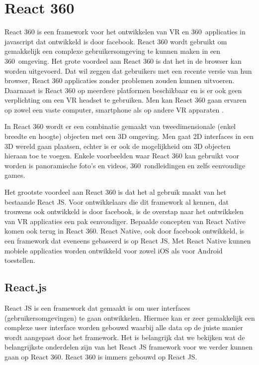 \chapter{React 360}
\label{ch:react-360}

React 360 is een framework voor het ontwikkelen van VR en 360\textdegree\ applicaties in javascript dat ontwikkeld is door facebook. React 360 wordt gebruikt om gemakkelijk een complexe gebruikersomgeving te kunnen maken in een 360\textdegree\ omgeving. Het grote voordeel aan React 360 is dat het in de browser kan worden uitgevoerd. Dat wil zeggen dat gebruikers met een recente versie van hun browser, React 360 applicaties zonder problemen zouden kunnen uitvoeren. Daarnaast is React 360 op meerdere platformen beschikbaar en is er ook geen verplichting om een VR headset te gebruiken. Men kan React 360 gaan ervaren op zowel een vaste computer, smartphone als op andere VR apparaten \autocite{Lehr2017}.

In React 360 wordt er een combinatie gemaakt van tweedimensionale (enkel breedte en hoogte) objecten met een 3D omgeving. Men gaat 2D interfaces in een 3D wereld gaan plaatsen, echter is er ook de mogelijkheid om 3D objecten hieraan toe te voegen. Enkele voorbeelden waar React 360 kan gebruikt voor worden is panoramische foto's en videos, 360\textdegree\ rondleidingen en zelfs eenvoudige games.

Het grootste voordeel aan React 360 is dat het al gebruik maakt van het bestaande React JS. Voor ontwikkelaars die dit framework al kennen, dat trouwens ook ontwikkeld is door facebook, is de overstap naar het ontwikkelen van VR applicaties een pak eenvoudiger. Bepaalde concepten van React Native komen ook terug in React 360. React Native, ook door facebook ontwikkeld, is een framework dat eveneens gebaseerd is op React JS. Met React Native kunnen mobiele applicaties worden ontwikkeld voor zowel iOS als voor Android toestellen.

\section{React.js}
\label{sec:reactjs}
React JS is een framework dat gemaakt is om user interfaces (gebruikersomgevingen) te gaan ontwikkelen. Hiermee kan er zeer gemakkelijk een complexe user interface worden gebouwd waarbij alle data op de juiste manier wordt aangepast door het framework. Het is belangrijk dat we bekijken wat de belangrijkste onderdelen zijn van het React JS framework voor we verder kunnen gaan op React 360. React 360 is immers gebouwd op React JS.

